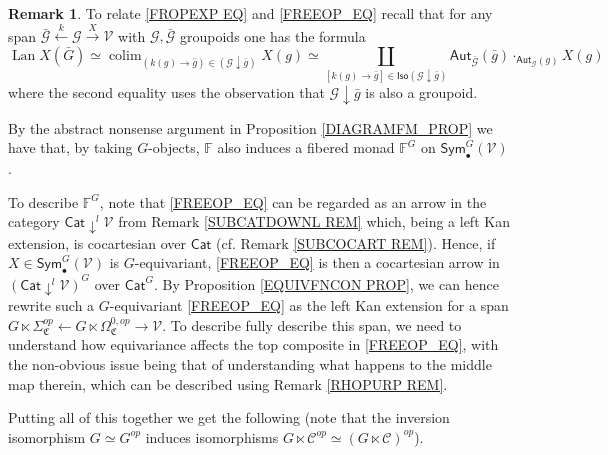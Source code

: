 \documentclass[a4paper,10pt
,draft
]{article}%
\numberwithin{equation}{section}
\numberwithin{figure}{section}
\theoremstyle{definition} %
\newtheorem{remark}[equation]{Remark}%
\DeclareMathOperator{\colim}{colim}%
\DeclareMathOperator{\Lan}{Lan}%
\newcommand{\V}{\ensuremath{\mathcal V}}
\newcommand{\1}{\ensuremath{\mathbbm 1}}%
\begin{document}
\begin{remark}\label{CONVER REM}
To relate \eqref{FROPEXP EQ} and \eqref{FREEOP_EQ} recall that 
for any span 
$\bar{\mathcal{G}} \overset{k}{\leftarrow} \mathcal{G} \xrightarrow{X} \mathcal{V}$
with $\mathcal{G},\bar{\mathcal{G}}$ groupoids
one has the formula
\[\Lan X (\bar{G}) \simeq 
\colim_{(k(g) \to \bar{g})\in (\mathcal{G} \downarrow \bar{g})} X(g) \simeq
\coprod_{[k(g) \to \bar{g}] 
\in \mathsf{Iso}(\mathcal{G} \downarrow \bar{g})}
\mathsf{Aut}_{\bar{\mathcal{G}}}(\bar{g})
\cdot_{\mathsf{Aut}_{\mathcal{G}}(g)}
X(g)
\]
where the second equality uses the observation that
$\mathcal{G} \downarrow \bar{g}$
is also a groupoid.
\end{remark}


By the abstract nonsense argument in 
Proposition \ref{DIAGRAMFM_PROP}
we have that, by taking $G$-objects, 
$\mathbb{F}$ also induces a fibered monad 
$\mathbb{F}^G$ on $\mathsf{Sym}^G_{\bullet}(\V)$.

To describe $\mathbb{F}^G$,
note that \eqref{FREEOP_EQ}
can be regarded as an arrow in 
the category $\mathsf{Cat} \downarrow^l \V$
from Remark \ref{SUBCATDOWNL REM}
which, being a left Kan extension, is cocartesian over $\mathsf{Cat}$ (cf. Remark \ref{SUBCOCART REM}).
Hence, if $X \in \mathsf{Sym}_{\bullet}^G(\V)$
is $G$-equivariant, 
\eqref{FREEOP_EQ} is then a cocartesian arrow in 
$\left(\mathsf{Cat} \downarrow^l \V\right)^G$
over $\mathsf{Cat}^G$.
By Proposition \ref{EQUIVFNCON PROP},
we can hence rewrite 
such a $G$-equivariant \eqref{FREEOP_EQ}
as the left Kan extension for a span
$G \ltimes \Sigma^{op}_{\mathfrak{C}}
\leftarrow 
G \ltimes \Omega^{0,op}_{\mathfrak{C}}
\to 
\V$.
To describe fully describe this span,
we need to understand how equivariance 
affects the top composite in \eqref{FREEOP_EQ},
with the non-obvious issue being that of understanding
what happens to the middle map therein, which can be described using
Remark \ref{RHOPURP REM}.

Putting all of this together we get the following
(note that the inversion isomorphism
$G \simeq G^{op}$
induces isomorphisms
$G \ltimes \mathcal{C}^{op} \simeq (G \ltimes \mathcal{C})^{op}$).
\end{document}
